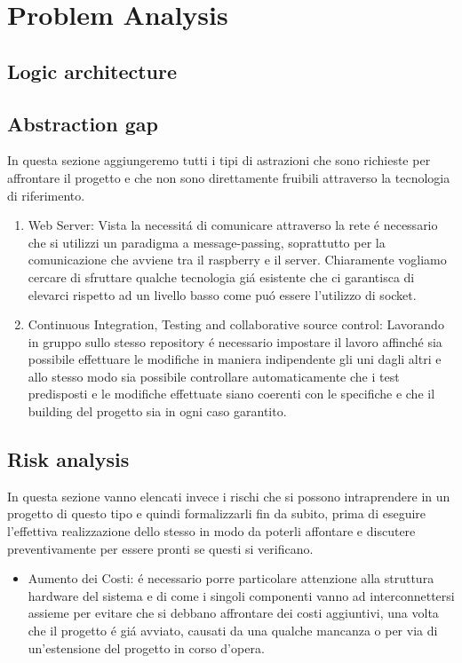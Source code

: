 \section{Problem Analysis}
\subsection{Logic architecture}
\subsection{Abstraction gap}

In questa sezione aggiungeremo tutti i tipi di astrazioni che sono richieste per affrontare il progetto e che non sono direttamente fruibili attraverso la tecnologia di riferimento.

\begin{enumerate}
  \item Web Server: Vista la necessit\'a di comunicare attraverso la rete \'e necessario che si utilizzi un paradigma a message-passing, soprattutto per la comunicazione che avviene tra il raspberry e il server. Chiaramente vogliamo cercare di sfruttare qualche tecnologia gi\'a esistente che ci garantisca di elevarci rispetto ad un livello basso come pu\'o essere l'utilizzo di socket.
  \item Continuous Integration, Testing and collaborative source control: Lavorando in gruppo sullo stesso repository \'e necessario impostare il lavoro affinch\'e sia possibile effettuare le modifiche in maniera indipendente gli uni dagli altri e allo stesso modo sia possibile controllare automaticamente che i test predisposti e le modifiche effettuate siano coerenti con le specifiche e che il building del progetto sia in ogni caso garantito.
\end{enumerate}

\subsection{Risk analysis}

In questa sezione vanno elencati invece i rischi che si possono intraprendere in un progetto di questo tipo e quindi formalizzarli fin da subito, prima di eseguire l'effettiva realizzazione dello stesso in modo da poterli affontare e discutere preventivamente per essere pronti se questi si verificano.

\begin{itemize}
  \item Aumento dei Costi: \'e necessario porre particolare attenzione alla struttura hardware del sistema e di come i singoli componenti vanno ad interconnettersi assieme per evitare che si debbano affrontare dei costi aggiuntivi, una volta che il progetto \'e gi\'a avviato, causati da una qualche mancanza o per via di un'estensione del progetto in corso d'opera.
\end{itemize}

